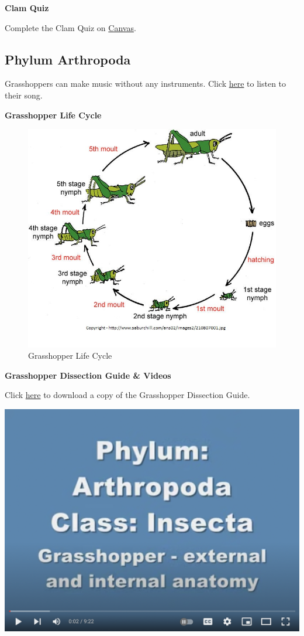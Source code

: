 \documentclass[
]{book}
\begin{document}
\textbf{Clam Quiz}

Complete the Clam Quiz on \href{https://canvas.ubc.ca/}{Canvas}.

\hypertarget{phylum-arthropoda-1}{%
\subsection*{Phylum Arthropoda}\label{phylum-arthropoda-1}}

Grasshoppers can make music without any instruments. Click \href{https://www.youtube.com/watch?v=nyglT-rWE5c}{here} to listen to their song.

\textbf{Grasshopper Life Cycle}

\begin{figure}
\centering
\includegraphics{images/Lab4_grass_hopper_life_cycle.png}
\caption{Grasshopper Life Cycle}
\end{figure}

\textbf{Grasshopper Dissection Guide \& Videos}

Click \href{files/Lab4_grasshopper_dissection_guide.pdf}{here} to download a copy of the Grasshopper Dissection Guide.

\includegraphics{images/Lab4_Grasshopper_Dissection_Video1.png}
\end{document}
